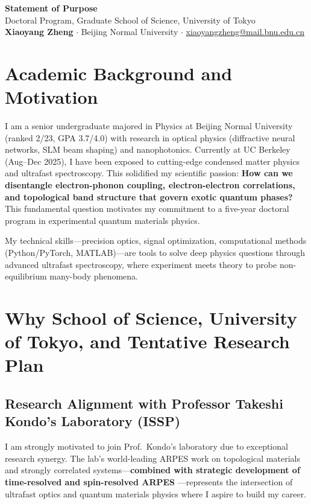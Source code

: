 \documentclass[11pt,a4paper]{article}
\begin{document}
\begin{center}
    {\large \textbf{Statement of Purpose}}\\[0.2em]
    {\normalsize Doctoral Program, Graduate School of Science, University of Tokyo}\\[0.5em]
    \textbf{Xiaoyang Zheng} $\cdot$ Beijing Normal University $\cdot$ \href{mailto:xiaoyangzheng@mail.bnu.edu.cn}{xiaoyangzheng@mail.bnu.edu.cn}
\end{center}

\vspace{-0.4em}

\section{Academic Background and Motivation}

I am a senior undergraduate majored in Physics at Beijing Normal University (ranked 2/23, GPA 3.7/4.0) with research in optical physics (diffractive neural networks, SLM beam shaping) and nanophotonics. Currently at UC Berkeley (Aug--Dec 2025), I have been exposed to cutting-edge condensed matter physics and ultrafast spectroscopy. This solidified my scientific passion: \textbf{How can we disentangle electron-phonon coupling, electron-electron correlations, and topological band structure that govern exotic quantum phases?} This fundamental question motivates my commitment to a five-year doctoral program in experimental quantum materials physics.

My technical skills—precision optics, signal optimization, computational methods (Python/PyTorch, MATLAB)—are tools to solve deep physics questions through advanced ultrafast spectroscopy, where experiment meets theory to probe non-equilibrium many-body phenomena.

\section{Why School of Science, University of Tokyo, and Tentative Research Plan}

\subsection{Research Alignment with Professor Takeshi Kondo's Laboratory (ISSP)}

I am strongly motivated to join Prof.~Kondo's laboratory due to exceptional research synergy. The lab's world-leading ARPES work on topological materials and strongly correlated systems—\textbf{combined with strategic development of time-resolved and spin-resolved ARPES} —represents the intersection of ultrafast optics and quantum materials physics where I aspire to build my career.
\end{document}
